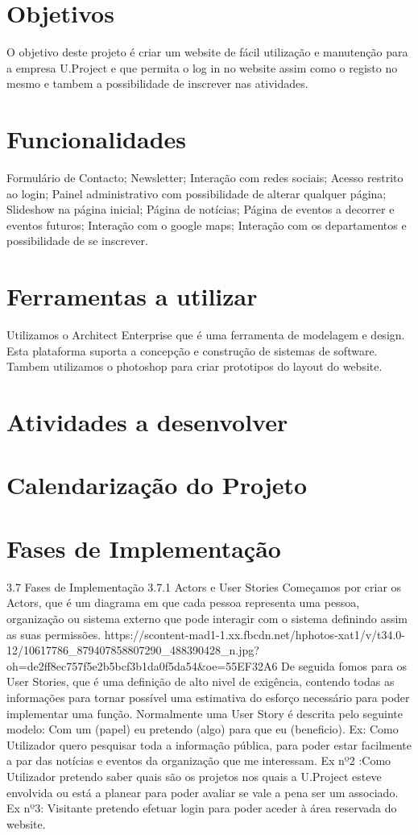 \documentclass[11pt]{report}
\begin{document}
\section{Objetivos}
O objetivo deste projeto é criar um website de fácil utilização e manutenção para a empresa U.Project e que permita o log in no website assim como o registo no mesmo e tambem a possibilidade de inscrever nas atividades.
\section{Funcionalidades}
Formulário de Contacto;
Newsletter;
Interação com redes sociais;
Acesso restrito ao login;
Painel administrativo com possibilidade de alterar qualquer página;
Slideshow na página inicial;
Página de notícias;
Página de eventos a decorrer e eventos futuros;
Interação com o google maps;
Interação com os departamentos e possibilidade de se inscrever.
\section{Ferramentas a utilizar}
Utilizamos o Architect Enterprise que é uma ferramenta de modelagem e design. Esta plataforma suporta a concepção e construção de sistemas de software.
Tambem utilizamos o photoshop para criar prototipos do layout do website.
\section{Atividades a desenvolver}

\section{Calendarização do Projeto}

\section{Fases de Implementação}
3.7 Fases de Implementação
	3.7.1 Actors e User Stories
Começamos por criar os Actors, que é um diagrama em que cada pessoa representa uma pessoa, organização ou sistema externo que pode interagir com o sistema definindo assim as suas permissões.
https://scontent-mad1-1.xx.fbcdn.net/hphotos-xat1/v/t34.0-12/10617786_879407858807290_488390428_n.jpg?oh=de2ff8ec757f5e2b5bcf3b1da0f5da54&oe=55EF32A6
De seguida fomos para os User Stories, que é uma definição de alto nivel de exigência, contendo todas as informações para tornar possível uma estimativa do esforço necessário para poder implementar uma função. Normalmente uma User Story é descrita pelo seguinte modelo: 
Com um (papel) eu pretendo (algo) para que eu (beneficio).
Ex: Como Utilizador quero pesquisar toda a informação pública, para poder estar facilmente a par das notícias e eventos da organização que me interessam.
Ex nº2 :Como Utilizador pretendo saber quais são os projetos nos quais a U.Project esteve envolvida ou está a planear para poder avaliar se vale a pena ser um associado.
Ex nº3: Visitante pretendo efetuar login para poder aceder à área reservada do website.
\end{document}
